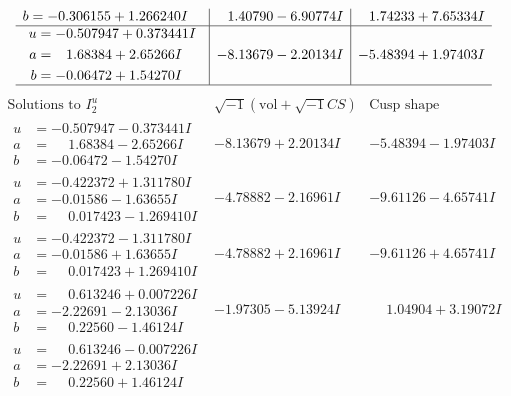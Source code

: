 \documentclass[1p]{elsarticle_modified}
\theoremstyle{definition}
\newcommand{\I}{\sqrt{-1}}
\begin{document}
$$\begin{array}{c|c|c}
\begin{aligned}
b &= -0.306155 + 1.266240 I\end{aligned}
 & \phantom{-}1.40790 - 6.90774 I & \phantom{-}1.74233 + 7.65334 I \\ \hline\begin{aligned}
u &= -0.507947 + 0.373441 I \\
a &= \phantom{-}1.68384 + 2.65266 I \\
b &= -0.06472 + 1.54270 I\end{aligned}
 & -8.13679 - 2.20134 I & -5.48394 + 1.97403 I\\
 \hline 
 \end{array}$$\newpage$$\begin{array}{c|c|c}  
\text{Solutions to }I^u_{2}& \I (\text{vol} + \sqrt{-1}CS) & \text{Cusp shape}\\
 \hline 
\begin{aligned}
u &= -0.507947 - 0.373441 I \\
a &= \phantom{-}1.68384 - 2.65266 I \\
b &= -0.06472 - 1.54270 I\end{aligned}
 & -8.13679 + 2.20134 I & -5.48394 - 1.97403 I \\ \hline\begin{aligned}
u &= -0.422372 + 1.311780 I \\
a &= -0.01586 - 1.63655 I \\
b &= \phantom{-}0.017423 - 1.269410 I\end{aligned}
 & -4.78882 - 2.16961 I & -9.61126 - 4.65741 I \\ \hline\begin{aligned}
u &= -0.422372 - 1.311780 I \\
a &= -0.01586 + 1.63655 I \\
b &= \phantom{-}0.017423 + 1.269410 I\end{aligned}
 & -4.78882 + 2.16961 I & -9.61126 + 4.65741 I \\ \hline\begin{aligned}
u &= \phantom{-}0.613246 + 0.007226 I \\
a &= -2.22691 - 2.13036 I \\
b &= \phantom{-}0.22560 - 1.46124 I\end{aligned}
 & -1.97305 - 5.13924 I & \phantom{-}1.04904 + 3.19072 I \\ \hline\begin{aligned}
u &= \phantom{-}0.613246 - 0.007226 I \\
a &= -2.22691 + 2.13036 I \\
b &= \phantom{-}0.22560 + 1.46124 I\end{aligned}

\end{array}$$
\end{document}
